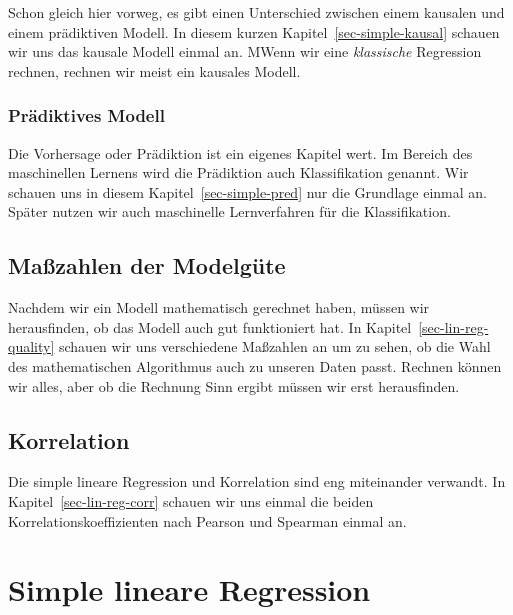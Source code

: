 \documentclass[
  letterpaper,
]{scrbook}
\begin{document}
Schon gleich hier vorweg, es gibt einen Unterschied zwischen einem
kausalen und einem prädiktiven Modell. In diesem kurzen
Kapitel~\ref{sec-simple-kausal} schauen wir uns das kausale Modell
einmal an. MWenn wir eine \emph{klassische} Regression rechnen, rechnen
wir meist ein kausales Modell.

\hypertarget{pruxe4diktives-modell}{%
\subsection*{Prädiktives Modell}\label{pruxe4diktives-modell}}

Die Vorhersage oder Prädiktion ist ein eigenes Kapitel wert. Im Bereich
des maschinellen Lernens wird die Prädiktion auch Klassifikation
genannt. Wir schauen uns in diesem Kapitel~\ref{sec-simple-pred} nur die
Grundlage einmal an. Später nutzen wir auch maschinelle Lernverfahren
für die Klassifikation.

\hypertarget{mauxdfzahlen-der-modelguxfcte}{%
\section*{Maßzahlen der Modelgüte}\label{mauxdfzahlen-der-modelguxfcte}}

Nachdem wir ein Modell mathematisch gerechnet haben, müssen wir
herausfinden, ob das Modell auch gut funktioniert hat. In
Kapitel~\ref{sec-lin-reg-quality} schauen wir uns verschiedene Maßzahlen
an um zu sehen, ob die Wahl des mathematischen Algorithmus auch zu
unseren Daten passt. Rechnen können wir alles, aber ob die Rechnung Sinn
ergibt müssen wir erst herausfinden.

\hypertarget{korrelation}{%
\section*{Korrelation}\label{korrelation}}

Die simple lineare Regression und Korrelation sind eng miteinander
verwandt. In Kapitel~\ref{sec-lin-reg-corr} schauen wir uns einmal die
beiden Korrelationskoeffizienten nach Pearson und Spearman einmal an.

\hypertarget{sec-modeling-simple-stat}{%
\chapter{Simple lineare Regression}\label{sec-modeling-simple-stat}}
\end{document}
